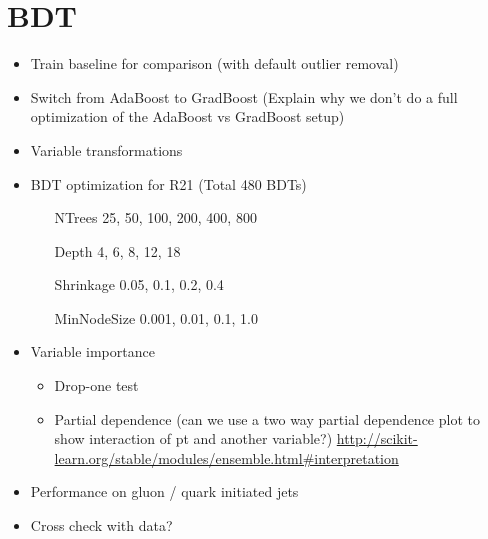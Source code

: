\chapter{BDT}
\label{sec:bdt}

\begin{itemize}
\item Train baseline for comparison (with default outlier removal)

\item Switch from AdaBoost to GradBoost (Explain why we don't do a full
  optimization of the AdaBoost vs GradBoost setup)

\item Variable transformations

\item BDT optimization for R21 (Total 480 BDTs)
  \begin{itemize}
  \item[NTrees] 25, 50, 100, 200, 400, 800
  \item[Depth] 4, 6, 8, 12, 18
  \item[Shrinkage] 0.05, 0.1, 0.2, 0.4
  \item[MinNodeSize] 0.001, 0.01, 0.1, 1.0
  \end{itemize}


\item Variable importance
  \begin{itemize}
  \item Drop-one test
  \item Partial dependence (can we use a two way partial dependence plot to
    show interaction of pt and another variable?)
    \url{http://scikit-learn.org/stable/modules/ensemble.html#interpretation}
  \end{itemize}

\item Performance on gluon / quark initiated jets

\item Cross check with data?

\end{itemize}

